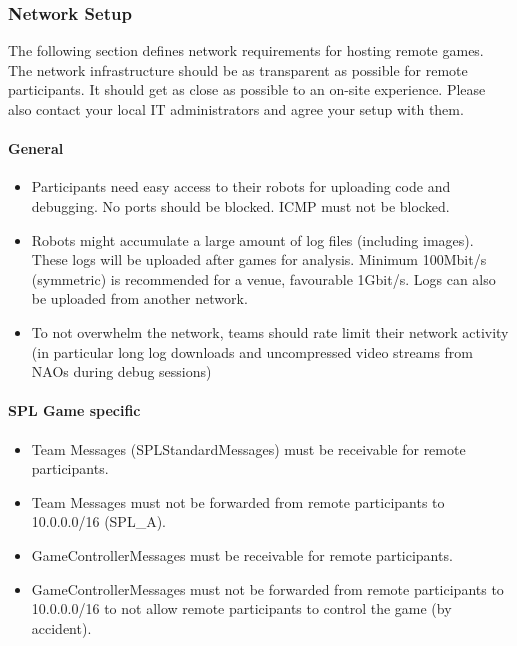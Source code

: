 \subsubsection{Network Setup}
The following section defines network requirements for hosting remote games. The network infrastructure should be as transparent as possible for remote participants. It should get as close as possible to an on-site experience. Please also contact your local IT administrators and agree your setup with them.

\paragraph{General}

\begin{itemize}
    \item Participants need easy access to their robots for uploading code and debugging. No ports should be blocked. ICMP must not be blocked. %
    \item Robots might accumulate a large amount of log files (including images). These logs will be uploaded after games for analysis. Minimum 100Mbit/s (symmetric) is recommended for a venue, favourable 1Gbit/s. Logs can also be uploaded from another network.
    \item To not overwhelm the network, teams should rate limit their network activity (in particular long log downloads and uncompressed video streams from NAOs during debug sessions)
\end{itemize}

\paragraph{SPL Game specific}

\begin{itemize}
    \item Team Messages (SPLStandardMessages) must be receivable for remote participants.
    \item Team Messages must not be forwarded from remote participants to 10.0.0.0/16 (SPL\_A).
    \item GameControllerMessages must be receivable for remote participants.
    \item GameControllerMessages must not be forwarded from remote participants to 10.0.0.0/16 to not allow remote participants to control the game (by accident).
\end{itemize}

